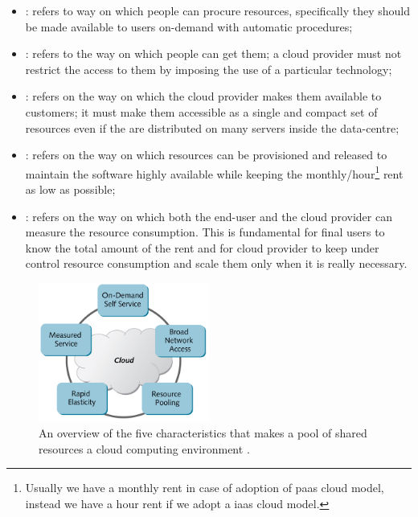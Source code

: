 \begin{itemize}
	\item{: refers to way on which people can procure resources, specifically
		they should be made available to users on-demand with automatic procedures;}
	\item{: refers to the way on which people can get them; a cloud provider
		must not restrict the access to them by imposing the use of a particular technology;}
	\item{: refers on the way on which the cloud provider makes them available to
		customers; it must make them accessible as a single and compact set of resources even if the are
		distributed on many servers inside the data-centre;}
	\item{: refers on the way on which resources can be provisioned and released
		to maintain the software highly available while keeping the monthly/hour\footnote{Usually we have a
		monthly rent in case of adoption of \acs{paas} cloud model, instead we have a hour rent if we adopt
		a \acs{iaas} cloud model.} rent as low as possible;}
	\item{: refers on the way on which both the end-user and the cloud provider
		can measure the resource consumption. This is fundamental for final users to know the total amount of
		the rent and for cloud provider to keep under control resource consumption and scale them only when
		it is really necessary.}
\end{itemize}

\begin{figure}
	\centering{}
	\includegraphics[width=0.5\textwidth]{chapters/background/images/cloud-characteristics.png}
	\caption[Key characteristics of cloud computing]{An overview of the five characteristics that makes a
		pool of shared resources a cloud computing environment \cite{cloudCharacteristics}.}
	\label{img:background-cloudComputing-characteristics}
\end{figure}

